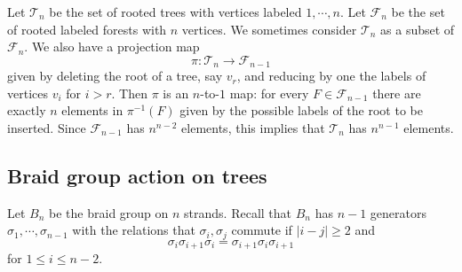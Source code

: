 \documentclass[11pt]{amsart}
\theoremstyle{definition}
\theoremstyle{remark}
\numberwithin{equation}{section}
\newcommand{\cF}{\ensuremath{{\mathcal{F}}}}
\newcommand{\cT}{\ensuremath{{\mathcal{T}}}}
\begin{document}
Let $\cT_n$ be the set of rooted trees with vertices labeled $1,\cdots,n$. Let $\cF_n$ be the set of rooted labeled forests with $n$ vertices. We sometimes consider $\cT_n$ as a subset of $\cF_n$. We also have a projection map
\[
    \pi:\cT_n\to \cF_{n-1}
\]
given by deleting the root of a tree, say $v_r$, and reducing by one the labels of vertices $v_i$ for $i>r$. Then $\pi$ is an $n$-to-$1$ map: for every $F\in \cF_{n-1}$ there are exactly $n$ elements in $\pi^{-1}(F)$ given by the possible labels of the root to be inserted. Since $\cF_{n-1}$ has $n^{n-2}$ elements, this implies that $\cT_n$ has $n^{n-1}$ elements.

\subsection{Braid group action on trees}\label{ss: braid action on trees}

Let $B_n$ be the braid group on $n$ strands. Recall that $B_n$ has $n-1$ generators $\sigma_1,\cdots,\sigma_{n-1}$ with the relations that $\sigma_i,\sigma_j$ commute if $|i-j|\ge2$ and
\begin{equation}\label{eq: braid relation}
\sigma_i\sigma_{i+1}\sigma_i=\sigma_{i+1}\sigma_i\sigma_{i+1}
\end{equation}
for $1\le i\le n-2$.
\end{document}
